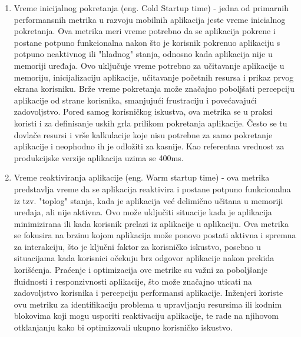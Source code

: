 \documentclass[12pt,oneside]{memoir}
\begin{document}
\begin{enumerate}
    \item Vreme inicijalnog pokretanja (eng. Cold Startup time) - jedna od primarnih performansnih metrika u razvoju mobilnih aplikacija jeste vreme inicialnog pokretanja. Ova metrika meri vreme potrebno da se aplikacija pokrene i postane potpuno funkcionalna nakon što je korisnik pokrenuo aplikaciju s potpuno neaktivnog ili "hladnog" stanja, odnosno kada aplikacija nije u memoriji uređaja. Ovo uključuje vreme potrebno za učitavanje aplikacije u memoriju, inicijalizaciju aplikacije, učitavanje početnih resursa i prikaz prvog ekrana korisniku. Brže vreme pokretanja može značajno poboljšati percepciju aplikacije od strane korisnika, smanjujući frustraciju i povećavajući zadovoljstvo. Pored samog korisničkog iskustva, ova metrika se u praksi koristi i za definisanje uskih grla prilikom pokretanja aplikacije. Često se tu dovlače resursi i vrše kalkulacije koje nisu potrebne za samo pokretanje aplikacije i neophodno ih je odložiti za kasnije. Kao referentna vrednost za produkcijske verzije aplikacija uzima se 400ms.
    \item Vreme reaktiviranja aplikacije (eng. Warm startup time) - ova metrika predstavlja vreme da se aplikacija reaktivira i postane potpuno funkcionalna iz tzv. "toplog" stanja, kada je aplikacija već delimično učitana u memoriji uređaja, ali nije aktivna. Ovo može uključiti situacije kada je aplikacija minimizirana ili kada korisnik prelazi iz aplikacije u aplikaciju. Ova metrika se fokusira na brzinu kojom aplikacija može ponovo postati aktivna i spremna za interakciju, što je ključni faktor za korisničko iskustvo, posebno u situacijama kada korisnici očekuju brz odgovor aplikacije nakon prekida korišćenja. Praćenje i optimizacija ove metrike su važni za poboljšanje fluidnosti i responzivnosti aplikacije, što može značajno uticati na zadovoljstvo korisnika i percepciju performansi aplikacije. Inženjeri koriste ovu metriku za identifikaciju problema u upravljanju resursima ili kodnim blokovima koji mogu usporiti reaktivaciju aplikacije, te rade na njihovom otklanjanju kako bi optimizovali ukupno korisničko iskustvo.

\end{enumerate}
\end{document}
